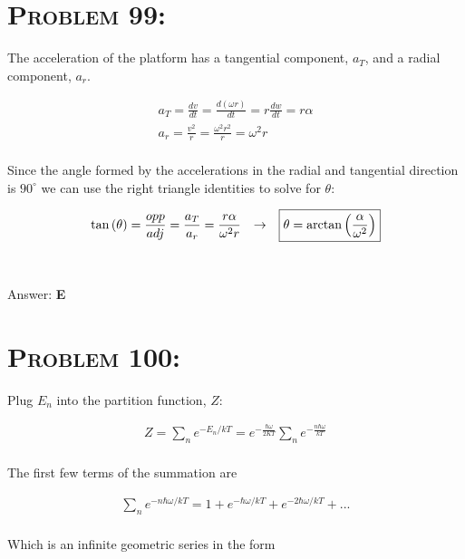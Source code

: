 \documentclass{article}
\begin{document}

\section{\textsc{Problem 99:}} The acceleration of the platform has a tangential component, $a_{T}$, and a radial component, $a_{r}$.

\begin{gather}
a_{T} = \frac{dv}{dt} = \frac{d (\omega r)}{d t} = r \frac{dw}{dt} = r \alpha\nonumber\\
a_{r} = \frac{v^{2}}{r} = \frac{\omega^{2} r^{2}}{r} = \omega^{2} r\nonumber
\end{gather}
\\
Since the angle formed by the accelerations in the radial and tangential direction is $90^{\circ}$ we can use the right triangle identities to solve for $\theta$:

\begin{gather}
\tan{(\theta)} = \frac{opp}{adj}= \frac{a_{T}}{a_{r}} = \frac{r \alpha}{\omega^{2} r} \hspace{.1in} \rightarrow \hspace{.1in} \boxed{\theta = \arctan{\left(  \frac{\alpha}{\omega^{2}}  \right)}}\nonumber
\end{gather}
\\\\
Answer: \textbf{\textcolor{ProcessBlue}E}\\


\section{\textsc{Problem 100:}} Plug $E_{n}$ into the partition function, $Z$:

\begin{gather}
Z = \sum_{n} e^{- E_{n}/kT} = e^{- \frac{\hbar \omega}{2KT}} \sum_{n} e^{- \frac{n \hbar \omega}{kT}}\nonumber
\end{gather}
\\
The first few terms of the summation are

\begin{gather}
\sum_{n} e^{- n \hbar \omega/kT}= 1 + e^{- \hbar \omega/kT} + e^{- 2 \hbar \omega/kT} + ...\nonumber
\end{gather}
\\
Which is an infinite geometric series in the form
\end{document}
